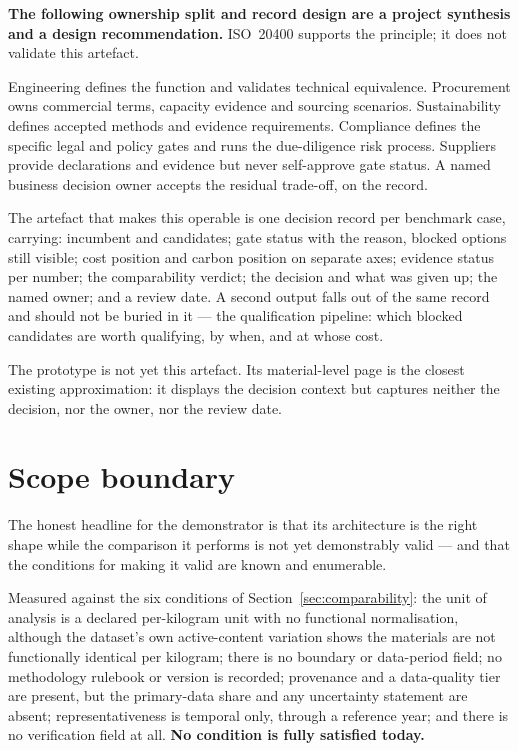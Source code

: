 \documentclass[10pt,twocolumn,a4paper]{article}
\begin{document}
\textbf{The following ownership split and record design are a project synthesis
and a design recommendation.} ISO~20400 supports the principle; it does not
validate this artefact.

Engineering defines the function and validates technical equivalence. Procurement
owns commercial terms, capacity evidence and sourcing scenarios. Sustainability
defines accepted methods and evidence requirements. Compliance defines the
specific legal and policy gates and runs the due-diligence risk process.
Suppliers provide declarations and evidence but never self-approve gate status. A
named business decision owner accepts the residual trade-off, on the record.

The artefact that makes this operable is one decision record per benchmark case,
carrying: incumbent and candidates; gate status with the reason, blocked options
still visible; cost position and carbon position on separate axes; evidence status
per number; the comparability verdict; the decision and what was given up; the
named owner; and a review date. A second output falls out of the same record and
should not be buried in it --- the qualification pipeline: which blocked
candidates are worth qualifying, by when, and at whose cost.

The prototype is not yet this artefact. Its material-level page is the closest
existing approximation: it displays the decision context but captures neither the
decision, nor the owner, nor the review date.

\section{Scope boundary}
\label{sec:boundary}

The honest headline for the demonstrator is that its architecture is the right
shape while the comparison it performs is not yet demonstrably valid ---
and that the conditions for making it valid are known and enumerable.

Measured against the six conditions of Section~\ref{sec:comparability}: the unit
of analysis is a declared per-kilogram unit with no functional normalisation,
although the dataset's own active-content variation shows the materials are not
functionally identical per kilogram; there is no boundary or data-period field; no
methodology rulebook or version is recorded; provenance and a data-quality tier
are present, but the primary-data share and any uncertainty statement are absent;
representativeness is temporal only, through a reference year; and there is no
verification field at all. \textbf{No condition is fully satisfied today.}
\end{document}
